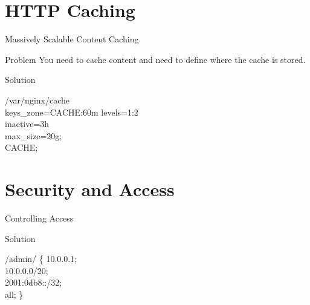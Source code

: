 \documentclass{beamer}
\begin{document}
\section{HTTP Caching}
\begin{frame}{Massively Scalable Content Caching}
	\begin{minipage}[t]{0.8\textwidth}
	\begin{block}{Problem}
		\vspace{0.02\textheight}
		You need to cache content and need to define where the cache is stored.
	\end{block}
	
	\begin{block}{Solution}
		\vspace{0.02\textheight}
		\scriptsize
		\begin{Alms*}
			
			 	/var/nginx/cache \NI
			\\
			keys\_zone=CACHE:60m
			levels=1:2 \\
			inactive=3h \\
			max\_size=20g;
			\\
			\ND {} CACHE;
			
		\end{Alms*}
	\end{block}
\end{minipage}
\end{frame}


\section{Security and Access}
\begin{frame}{Controlling Access}
	\begin{block}{Solution}
	\vspace{0.02\textheight}
	\scriptsize
	\begin{Alms*}
		 /admin/ \{ \NI
			 10.0.0.1; \\
			 10.0.0.0/20; \\
			 2001:0db8::/32; \\
			\K{deny} all;
		\ND \}
	\end{Alms*}
\end{block}
\end{frame}
\end{document}
